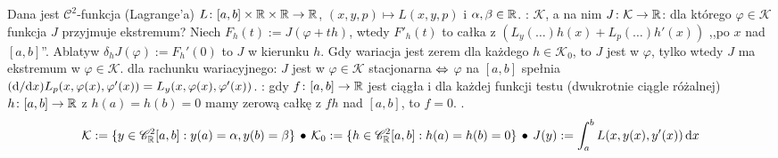 Dana  jest $\mathscr C^2$-funkcja (Lagrange'a) $L \colon [a,b] \times \mathbb{R} \times \mathbb{R} \to \mathbb{R}$, $(x,y,p) \mapsto L(x,y,p)$ i $\alpha, \beta \in \mathbb{R}$.
: $\mathcal K$, a na nim $J \colon \mathcal K \to \mathbb{R}$: dla którego $\varphi \in \mathcal K$ funkcja $J$ przyjmuje ekstremum?
Niech $F_h(t) := J(\varphi + th)$, wtedy $F'_h(t)$ to całka z $(L_y(\dots)h(x) + L_p(\dots)h'(x))$ ,,po $x$ nad $[a,b]$''. 
Ablatyw $\delta_h J (\varphi) := F_h'(0)$ to  $J$ w kierunku $h$.
Gdy wariacja jest zerem dla każdego $h \in \mathcal K_0$, to $J$ jest  w $\varphi$, tylko wtedy $J$ ma ekstremum w $\varphi \in \mathcal K$.
 dla rachunku wariacyjnego: $J$ jest w $\varphi \in \mathcal K$ stacjonarna $\Leftrightarrow$ $\varphi$ na $[a,b]$ spełnia $({\textrm{d}{}}/{\textrm{d}{} x}) L_p(x, \varphi(x), \varphi'(x)) = L_y(x, \varphi(x), \varphi'(x))$.
: gdy $f \colon [a,b] \to \mathbb{R}$ jest ciągła i dla każdej funkcji testu (dwukrotnie ciągle różalnej) $h \colon [a,b] \to \mathbb{R}$ z $h(a) = h(b) = 0$ mamy zerową całkę z $fh$ nad $[a,b]$, to $f = 0$.
\hfill
.
\[
 	\mathcal K := \{y \in \mathscr C_{\mathbb{R}}^2 [a,b] : y(a) = \alpha, y (b) = \beta\} \, \bullet \,
 	\mathcal K_0 := \{h \in \mathscr C_{\mathbb{R}}^2[a,b] : h(a) = h(b) = 0 \} \, \bullet \,
	J(y) := \int_a^b L(x, y(x), y'(x)) \, \textrm{d} x
\]